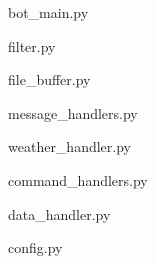 \newsection
{}

bot\_main.py


filter.py


file\_buffer.py


message\_handlers.py


weather\_handler.py


command\_handlers.py


data\_handler.py


config.py


\newsection
{}